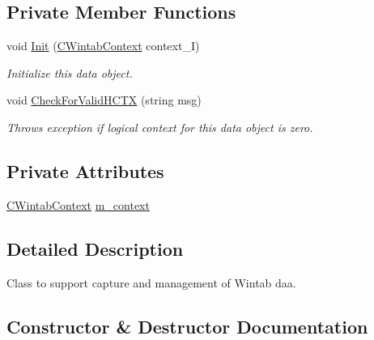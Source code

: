 \subsection*{Private Member Functions}
\begin{DoxyCompactItemize}
\item 
void \mbox{\hyperlink{class_wintab_d_n_1_1_c_wintab_data_ad835e6feccf5f4e7b1915893fe0bda59}{Init}} (\mbox{\hyperlink{class_wintab_d_n_1_1_c_wintab_context}{C\+Wintab\+Context}} context\+\_\+I)
\begin{DoxyCompactList}\small\item\em Initialize this data object. \end{DoxyCompactList}\item 
void \mbox{\hyperlink{class_wintab_d_n_1_1_c_wintab_data_a7f1321790e92a09e50871a565ee318f6}{Check\+For\+Valid\+H\+C\+TX}} (string msg)
\begin{DoxyCompactList}\small\item\em Throws exception if logical context for this data object is zero. \end{DoxyCompactList}\end{DoxyCompactItemize}
\subsection*{Private Attributes}
\begin{DoxyCompactItemize}
\item 
\mbox{\hyperlink{class_wintab_d_n_1_1_c_wintab_context}{C\+Wintab\+Context}} \mbox{\hyperlink{class_wintab_d_n_1_1_c_wintab_data_ac99bcbccfa440e49f068fa194f78a3cb}{m\+\_\+context}}
\end{DoxyCompactItemize}


\subsection{Detailed Description}
Class to support capture and management of Wintab daa. 



\subsection{Constructor \& Destructor Documentation}
\mbox{\label{class_wintab_d_n_1_1_c_wintab_data_a03c46068590647292be30a033ba68bcc}} 
